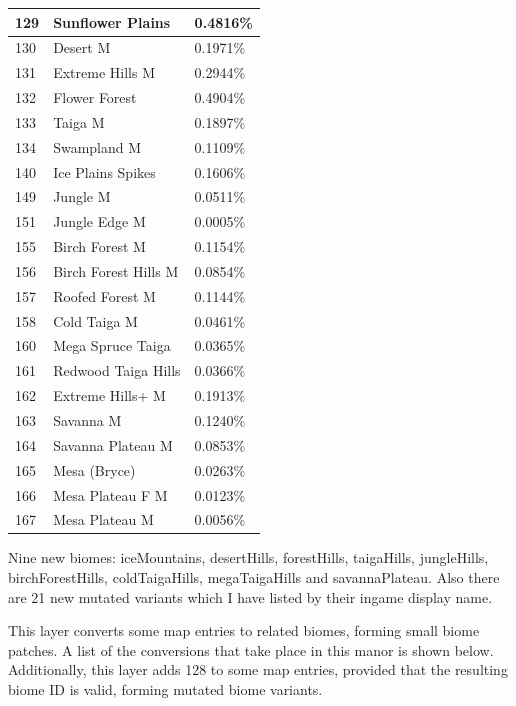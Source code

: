 \documentclass{article}
\begin{document}
	\newpage\noindent
	\begin{tabular}{|l|l|l|}\hline
		129    & Sunflower Plains     & 0.4816\%\\\hline
		130    & Desert M             & 0.1971\%\\\hline
		131    & Extreme Hills M      & 0.2944\%\\\hline
		132    & Flower Forest        & 0.4904\%\\\hline
		133    & Taiga M              & 0.1897\%\\\hline
		134    & Swampland M          & 0.1109\%\\\hline
		140    & Ice Plains Spikes    & 0.1606\%\\\hline
		149    & Jungle M             & 0.0511\%\\\hline
		151    & Jungle Edge M        & 0.0005\%\\\hline
		155    & Birch Forest M       & 0.1154\%\\\hline
		156    & Birch Forest Hills M & 0.0854\%\\\hline
		157    & Roofed Forest M      & 0.1144\%\\\hline
		158    & Cold Taiga M         & 0.0461\%\\\hline
		160    & Mega Spruce Taiga    & 0.0365\%\\\hline
		161    & Redwood Taiga Hills  & 0.0366\%\\\hline
		162    & Extreme Hills+ M     & 0.1913\%\\\hline
		163    & Savanna M            & 0.1240\%\\\hline
		164    & Savanna Plateau M    & 0.0853\%\\\hline
		165    & Mesa (Bryce)         & 0.0263\%\\\hline
		166    & Mesa Plateau F M     & 0.0123\%\\\hline
		167    & Mesa Plateau M       & 0.0056\%\\\hline
	\end{tabular}

	\medskip\noindent
	Nine new biomes: iceMountains, desertHills, forestHills, taigaHills, jungleHills, birchForestHills, coldTaigaHills, megaTaigaHills and savannaPlateau. Also there are 21 new mutated variants which I have listed by their ingame display name.

	This layer converts some map entries to related biomes, forming small biome patches. A list of the conversions that take place in this manor is shown below. Additionally, this layer adds 128 to some map entries, provided that the resulting biome ID is valid, forming mutated biome variants.
\end{document}
